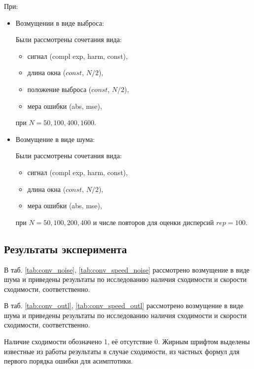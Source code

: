 \documentclass[specialist,
               substylefile = spbu.rtx,
               subf,href,colorlinks=true, 12pt]{disser}
\begin{document}
При:
    \begin{itemize}
    
        \item Возмущении в виде выброса: 
        
        Были рассмотрены сочетания вида: 
        \begin{itemize}
            \item сигнал (compl exp, harm, const),
            \item длина окна ($const$, $N/2$),
            \item положение выброса ($const$, $N / 2$),
            \item мера ошибки (abs, mse),
        \end{itemize}
        при $N = 50, 100, 400, 1600$.
        \item Возмущение в виде шума:
        
        Были рассмотрены сочетания вида: 
        \begin{itemize}
            \item сигнал (compl exp, harm, const),
            \item длина окна ($const$, $N/2$),
            \item мера ошибки (abs, mse),
        \end{itemize}
        при $N = 50, 100, 200, 400$ и числе повторов для оценки дисперсий $rep = 100$.
    \end{itemize}


\subsection{Результаты эксперимента}
В таб. \ref{tab:conv_noise}, \ref{tab:conv_speed_noise} рассмотрено возмущение в виде шума и приведены результаты по исследованию наличия сходимости и скорости сходимости, соответственно. 

В таб. \ref{tab:conv_outl}, \ref{tab:conv_speed_outl} рассмотрено возмущение в виде шума и приведены результаты по исследованию наличия сходимости и скорости сходимости, соответственно. 

Наличие сходимости обозначено 1, её отсутствие 0. Жирным шрифтом выделены известные из работы \cite{SenBach} результаты в случае сходимости, из частных формул для первого порядка ошибки для асимптотики.
\end{document}
